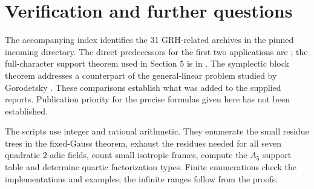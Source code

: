 \documentclass[10pt]{article}
\begin{document}
\clearpage






\section{Verification and further questions}
The accompanying index identifies the 31 GRH-related archives in the pinned incoming directory. The direct predecessors for the first two applications are \cite{fixed,packet,fieldprior}; the full-character support theorem used in Section 5 is in \cite{frobprior}. The symplectic block theorem addresses a counterpart of the general-linear problem studied by Gorodetsky \cite{goro}. These comparisons establish what was added to the supplied reports. Publication priority for the precise formulas given here has not been established.

The scripts use integer and rational arithmetic. They enumerate the small residue trees in the fixed-Gauss theorem, exhaust the residues needed for all seven quadratic $2$-adic fields, count small isotropic frames, compute the $A_5$ support table and determine quartic factorization types. Finite enumerations check the implementations and examples; the infinite ranges follow from the proofs.
\end{document}
